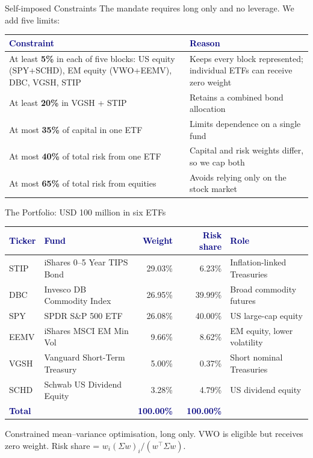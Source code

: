 \documentclass[aspectratio=169,11pt,t]{beamer}
\newcommand{\hd}[1]{\textcolor{navy}{\textbf{#1}}}
\newcommand{\smnote}[1]{{\footnotesize\color{muted}#1}}
\begin{document}
\begin{frame}{Self-imposed Constraints}
\vspace{0.7em}
{\small The mandate requires long only and no leverage. We add five limits:}
\vspace{0.7em}

\small
\renewcommand{\arraystretch}{1.25}
\begin{tabularx}{\textwidth}{@{}>{\raggedright\arraybackslash}p{6.8cm} X@{}}
\toprule
\hd{Constraint} & \hd{Reason}\\
\midrule
At least \textbf{5\%} in each of five blocks: US equity (SPY+SCHD), EM equity (VWO+EEMV), DBC, VGSH, STIP & Keeps every block represented; individual ETFs can receive zero weight\\
At least \textbf{20\%} in VGSH + STIP & Retains a combined bond allocation\\
At most \textbf{35\%} of capital in one ETF & Limits dependence on a single fund\\
At most \textbf{40\%} of total risk from one ETF & Capital and risk weights differ, so we cap both\\
At most \textbf{65\%} of total risk from equities & Avoids relying only on the stock market\\
\bottomrule
\end{tabularx}
\end{frame}

\begin{frame}{The Portfolio: USD 100 million in six ETFs}
\vspace{0.7em}
\scriptsize
\renewcommand{\arraystretch}{1.15}
\begin{tabularx}{\textwidth}{@{}l >{\raggedright\arraybackslash}X r r >{\raggedright\arraybackslash}p{3.1cm}@{}}
\toprule
\hd{Ticker} & \hd{Fund} & \hd{Weight} & \hd{Risk share} & \hd{Role}\\
\midrule
STIP & iShares 0--5 Year TIPS Bond & 29.03\% & 6.23\% & Inflation-linked Treasuries\\
DBC  & Invesco DB Commodity Index & 26.95\% & 39.99\% & Broad commodity futures\\
SPY  & SPDR S\&P 500 ETF & 26.08\% & 40.00\% & US large-cap equity\\
EEMV & iShares MSCI EM Min Vol & 9.66\% & 8.62\% & EM equity, lower volatility\\
VGSH & Vanguard Short-Term Treasury & 5.00\% & 0.37\% & Short nominal Treasuries\\
SCHD & Schwab US Dividend Equity & 3.28\% & 4.79\% & US dividend equity\\
\midrule
\hd{Total} & & \hd{100.00\%} & \hd{100.00\%} & \\
\bottomrule
\end{tabularx}
\vspace{0.5em}

\smnote{Constrained mean--variance optimisation, long only. VWO is eligible but receives zero weight. Risk share = $w_i(\Sigma w)_i/(w^\top\Sigma w)$.}
\end{frame}
\end{document}
